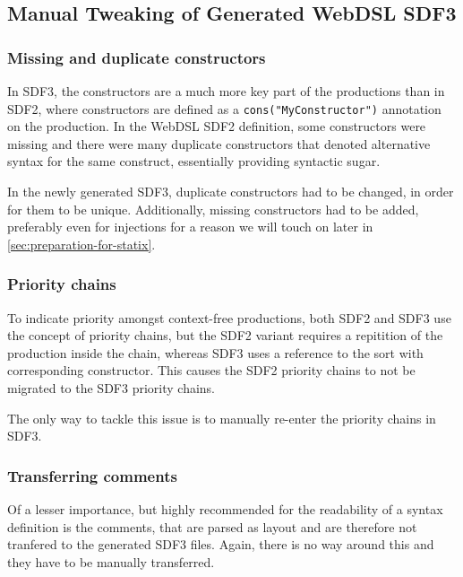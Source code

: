     \subsection{\label{subsec:manual-tweaking-sdf3}Manual Tweaking of Generated WebDSL SDF3}

      \subsubsection{Missing and duplicate constructors}

        In SDF3, the constructors are a much more key part of the productions than in SDF2, where constructors are defined as a \texttt{cons("MyConstructor")} annotation on the production. In the WebDSL SDF2 definition, some constructors were missing and there were many duplicate constructors that denoted alternative syntax for the same construct, essentially providing syntactic sugar.
        
        In the newly generated SDF3, duplicate constructors had to be changed, in order for them to be unique. Additionally, missing constructors had to be added, preferably even for injections for a reason we will touch on later in \cref{sec:preparation-for-statix}.

      \subsubsection{Priority chains}

        To indicate priority amongst context-free productions, both SDF2 and SDF3 use the concept of priority chains, but the SDF2 variant requires a repitition of the production inside the chain, whereas SDF3 uses a reference to the sort with corresponding constructor. This causes the SDF2 priority chains to not be migrated to the SDF3 priority chains.
        
        The only way to tackle this issue is to manually re-enter the priority chains in SDF3.

      \subsubsection{Transferring comments}

        Of a lesser importance, but highly recommended for the readability of a syntax definition is the comments, that are parsed as layout and are therefore not tranfered to the generated SDF3 files. Again, there is no way around this and they have to be manually transferred.

